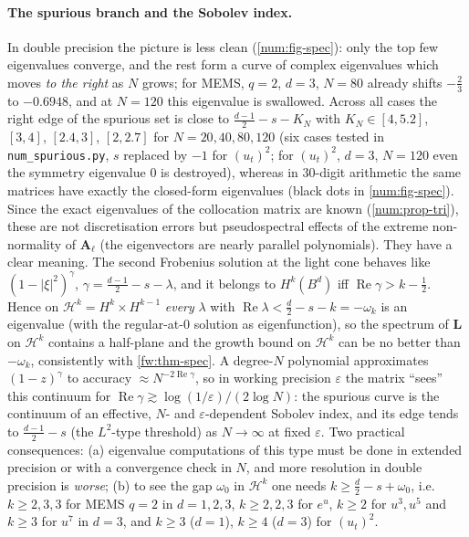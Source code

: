 \paragraph{The spurious branch and the Sobolev index.}
In double precision the picture is less clean (\cref{num:fig-spec}): only
the top few eigenvalues converge, and the rest form a curve of complex
eigenvalues which moves \emph{to the right} as $N$ grows; for MEMS, $q=2$,
$d=3$, $N=80$ already shifts $-\frac23$ to $-0.6948$, and at $N=120$ this
eigenvalue is swallowed. Across all cases the right edge of the spurious set
is close to $\frac{d-1}2-s-K_N$ with $K_N\in[4,5.2]$, $[3,4]$, $[2.4,3]$,
$[2,2.7]$ for $N=20,40,80,120$ (six cases tested in \texttt{num\_spurious.py}, $s$ replaced by $-1$ for
$(u_t)^2$; for $(u_t)^2$, $d=3$, $N=120$ even the symmetry eigenvalue $0$ is
destroyed), whereas in
$30$-digit arithmetic the same matrices have exactly the closed-form
eigenvalues (black dots in \cref{num:fig-spec}). Since the exact eigenvalues
of the collocation matrix are known (\cref{num:prop-tri}), these are not
discretisation errors but pseudospectral effects of the extreme
non-normality of $\mathbf A_\ell$ (the eigenvectors are nearly parallel
polynomials). They have a clear meaning. The second Frobenius solution at
the light cone behaves like $(1-|\xi|^2)^{\gamma}$, $\gamma=\frac{d-1}2-s-\lambda$, and
it belongs to $H^k(B^d)$ iff $\operatorname{Re}\gamma>k-\frac12$. Hence on
$\mathcal H^k=H^k\times H^{k-1}$ \emph{every} $\lambda$ with
$\operatorname{Re}\lambda<\frac d2-s-k=-\omega_k$ is an eigenvalue
(with the regular-at-$0$ solution as eigenfunction), so the spectrum of $\mathbf L$ on $\mathcal H^k$
contains a half-plane and the growth bound on $\mathcal H^k$ can be no better than $-\omega_k$, consistently with
\cref{fw:thm-spec}. A degree-$N$ polynomial approximates $(1-z)^\gamma$ to
accuracy $\approx N^{-2\operatorname{Re}\gamma}$, so in working precision
$\varepsilon$ the matrix ``sees'' this continuum for
$\operatorname{Re}\gamma\gtrsim\log(1/\varepsilon)/(2\log N)$: the spurious
curve is the continuum of an effective, $N$- and $\varepsilon$-dependent
Sobolev index, and its edge tends to $\frac{d-1}2-s$ (the $L^2$-type
threshold) as $N\to\infty$ at fixed $\varepsilon$. Two practical
consequences: (a) eigenvalue computations of this type must be done in
extended precision or with a convergence check in $N$, and more resolution
in double precision is \emph{worse}; (b) to see the gap $\omega_0$ in
$\mathcal H^k$ one needs $k\ge\frac d2-s+\omega_0$, i.e.\ $k\ge2,3,3$ for MEMS
$q=2$ in $d=1,2,3$, $k\ge2,2,3$ for $e^u$, $k\ge2$ for $u^3,u^5$ and $k\ge3$
for $u^7$ in $d=3$, and $k\ge3$ ($d=1$), $k\ge4$ ($d=3$) for $(u_t)^2$.

